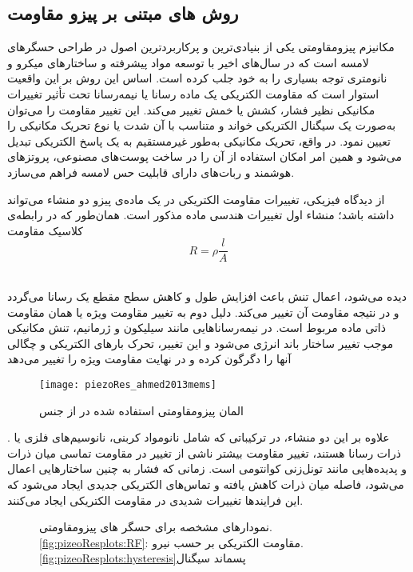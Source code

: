 \subsection{روش های مبتنی بر پیزو مقاومت}
مکانیزم پیزومقاومتی یکی از بنیادی‌ترین و پرکاربردترین اصول در طراحی حسگرهای لامسه است که در سال‌های اخیر با توسعه مواد پیشرفته و ساختارهای میکرو و نانومتری توجه بسیاری را به خود جلب کرده است. اساس این روش بر این واقعیت استوار است که مقاومت الکتریکی یک ماده رسانا یا نیمه‌رسانا تحت تأثیر تغییرات مکانیکی نظیر فشار، کشش یا خمش تغییر می‌کند. این تغییر مقاومت را می‌توان به‌صورت یک سیگنال الکتریکی خواند و متناسب با آن شدت یا نوع تحریک مکانیکی را تعیین نمود. در واقع، تحریک مکانیکی به‌طور غیرمستقیم به یک پاسخ الکتریکی تبدیل می‌شود و همین امر امکان استفاده از آن را در ساخت پوست‌های مصنوعی، پروتزهای هوشمند و ربات‌های دارای قابلیت حس لامسه فراهم می‌سازد.

از دیدگاه فیزیکی، تغییرات مقاومت الکتریکی در یک ماده‌ی پیزو دو منشاء می‌تواند داشته باشد؛ منشاء اول تغییرات هندسی ماده مذکور است. همان‌طور که در رابطه‌ی کلاسیک مقاومت 
\begin{equation}\label{eq:piezoRes1}
	R=\rho\frac{l}{A}
\end{equation}
​

دیده می‌شود، اعمال تنش باعث افزایش طول و کاهش سطح مقطع یک رسانا می‌گردد و در نتیجه مقاومت آن تغییر می‌کند. دلیل دوم به تغییر مقاومت ویژه یا همان مقاومت ذاتی ماده مربوط است. در نیمه‌رساناهایی مانند سیلیکون و ژرمانیم، تنش مکانیکی موجب تغییر ساختار باند انرژی می‌شود و این تغییر، تحرک بارهای الکتریکی و چگالی آنها را دگرگون کرده و در نهایت مقاومت ویژه را تغییر می‌دهد
\begin{figure}[ht]
	\centering
	\texttt{[image: piezoRes\_ahmed2013mems]}
	\caption{المان پیزومقاومتی استفاده شده در
		\cite{ahmed2013piezores}
		از جنس
		}
		\label{fig:ahmed_piezores}
	\end{figure}
	. علاوه بر این دو منشاء، در ترکیباتی که شامل نانومواد کربنی، نانوسیم‌های فلزی یا ذرات رسانا هستند، تغییر مقاومت بیشتر ناشی از تغییر در مقاومت تماسی میان ذرات و پدیده‌هایی مانند تونل‌زنی کوانتومی
	است. زمانی که فشار به چنین ساختارهایی اعمال می‌شود، فاصله میان ذرات کاهش یافته و تماس‌های الکتریکی جدیدی ایجاد می‌شود که این فرایندها تغییرات شدیدی در مقاومت الکتریکی ایجاد می‌کنند.
	\cite{xi2024mechanisms}

	
	\begin{figure}[ht]
		\centering 
		\caption{نمودارهای مشخصه برای حسگر های پیزومقاومتی.
		\ref{fig:pizeoResplots:RF}: مقاومت الکتریکی بر حسب نیرو.
	\ref{fig:pizeoResplots:hysteresis}پسماند سیگنال
\cite{koiva2013piezores}}
		\label{fig:pizeoResplots} %
	\end{figure}
	
